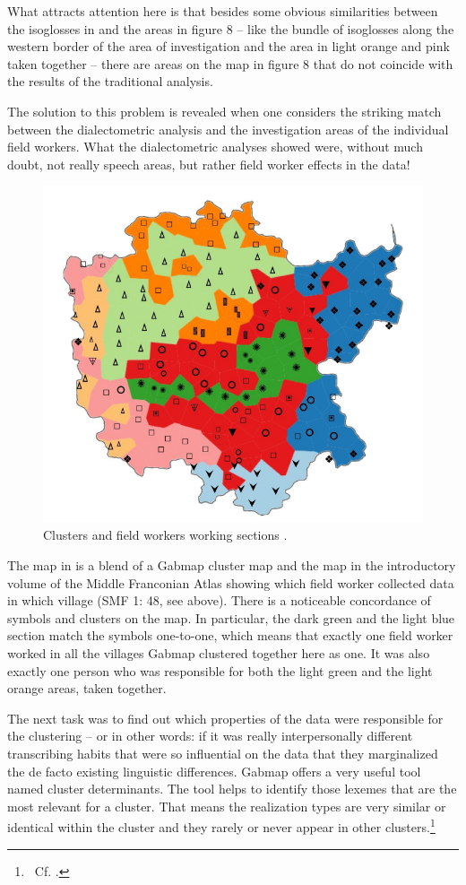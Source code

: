 \documentclass[output=paper]{LSP/langsci}
\begin{document}
What attracts attention here is that besides some obvious similarities between the isoglosses in  and the areas in figure 8 – like the bundle of isoglosses along the western border of the area of investigation and the area in light orange and pink taken together – there are areas on the map in figure 8 that do not coincide with the results of the traditional analysis.

The solution to this problem is revealed when one considers the striking match between the dialectometric analysis and the investigation areas of the individual field workers. What the dialectometric analyses showed were, without much doubt, not really speech areas, but rather field worker effects in the data!

\begin{figure}
\includegraphics[width=.7\textwidth]{illustrations/mathus_fig8}
\caption{Clusters and field worker{\textquotesingle}s working sections \citep[216]{mathussek_sprachraume_2014}.}
\label{fig:8}
\end{figure}

The map in  is a blend of a Gabmap cluster map and the map in the introductory volume of the Middle Franconian Atlas showing which field worker collected data in which village (SMF 1: 48, see  above). There is a noticeable concordance of symbols and clusters on the map. In particular, the dark green and the light blue section match the symbols one-to-one, which means that exactly one field worker worked in all the villages Gabmap clustered together here as one. It was also exactly one person who was responsible for both the light green and the light orange areas, taken together.

The next task was to find out which properties of the data were responsible for the clustering – or in other words: if it was really interpersonally different transcribing habits that were so influential on the data that they marginalized the de facto existing linguistic differences. Gabmap offers a very useful tool named cluster determinants. The tool helps to identify those lexemes that are the most relevant for a cluster. That means the realization types are very similar or identical within the cluster and they rarely or never appear in other clusters.\footnote{\ Cf. \citet{nerbonne_gabmap_2011}.}
\end{document}
